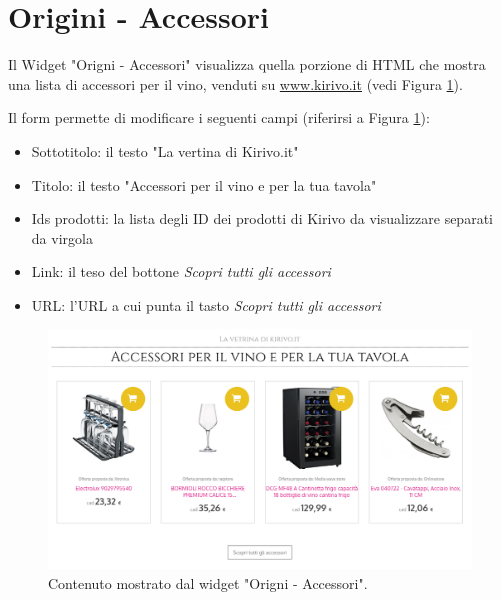 \newpage
\section{Origini - Accessori}
Il Widget "Origni - Accessori" visualizza quella porzione di HTML
che mostra una lista di accessori per il vino, venduti su \url{www.kirivo.it} (vedi Figura \ref{fig:access}).

Il form permette di modificare i seguenti campi (riferirsi a Figura \ref{fig:access}):
\begin{itemize}
\item Sottotitolo: il testo "La vertina di Kirivo.it"
\item Titolo: il testo "Accessori per il vino e per la tua tavola"
\item Ids prodotti: la lista degli ID dei prodotti di Kirivo da visualizzare separati da virgola
\item Link: il teso del bottone \emph{Scopri tutti gli accessori}
\item URL: l'URL a cui punta il tasto \emph{Scopri tutti gli accessori}
\end{itemize}

\begin{figure}
  \includegraphics[width=\textwidth]{figure/access.png}
  \caption{Contenuto mostrato dal widget "Origni - Accessori".}
  \label{fig:access}
\end{figure}

